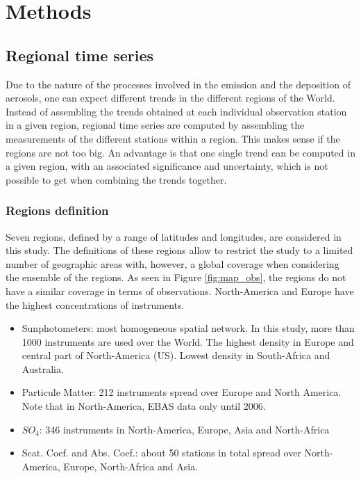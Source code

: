 \documentclass[journal abbreviation, manuscript]{copernicus}
\begin{document}
\section{Methods}

\subsection{Regional time series}
Due to the nature of the processes involved in the emission and the deposition of aerosols, one can expect different trends in the different regions of the World.
Instead of assembling the trends obtained at each individual observation station in a given region, regional time series are computed by assembling the measurements of the different stations within a region. This makes sense if the regions are not too big. An advantage is that one single trend can be computed in a given region, with an associated significance and uncertainty, which is not possible to get when combining the trends together.

\subsubsection{Regions definition}
Seven regions, defined by a range of latitudes and longitudes, are considered in this study. The definitions of these regions allow to restrict the study to a limited number of geographic areas with, however, a global coverage when considering the ensemble of the regions. As seen in Figure \ref{fig:map_obs}, the regions do not have a similar coverage in terms of observations. North-America and Europe have the highest concentrations of instruments.
\begin{itemize}
 \item Sunphotometers: most homogeneous spatial network. In this study, more than 1000 instruments are used over the World. The highest density in Europe and central part of North-America (US). Lowest density in South-Africa and Australia.
 \item Particule Matter: 212 instruments spread over Europe and North America. Note that in North-America, EBAS data only until 2006.
 \item $SO_{4}$: 346 instruments in North-America, Europe, Asia and North-Africa
 \item Scat. Coef. and Abs. Coef.: about 50 stations in total spread over North-America, Europe, North-Africa and Asia.
\end{itemize}
\end{document}
